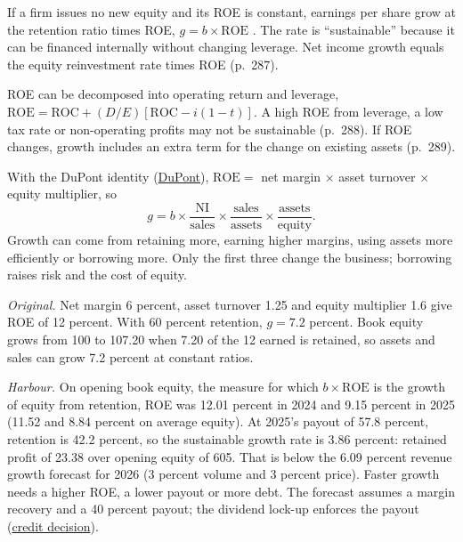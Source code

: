 \begin{qfmethod}\label{meth:sustainable-growth}
 If a firm issues no new equity and its ROE is constant, earnings per share grow at the retention ratio times ROE, $g=b\times\mathrm{ROE}$ \citep[pp.~285--286]{investment-valuation-2012}. The rate is ``sustainable'' because it can be financed internally without changing leverage. Net income growth equals the equity reinvestment rate times ROE (p.~287).

ROE can be decomposed into operating return and leverage, $\mathrm{ROE}=\mathrm{ROC}+(D/E)[\mathrm{ROC}-i(1-t)]$. A high ROE from leverage, a low tax rate or non-operating profits may not be sustainable (p.~288). If ROE changes, growth includes an extra term for the change on existing assets (p.~289).

With the DuPont identity (\hyperref[meth:return-on-equity-decomposition]{DuPont}), $\mathrm{ROE}=$ net margin $\times$ asset turnover $\times$ equity multiplier, so
\[ g=b\times\frac{\mathrm{NI}}{\text{sales}}\times\frac{\text{sales}}{\text{assets}}\times\frac{\text{assets}}{\text{equity}}. \]
Growth can come from retaining more, earning higher margins, using assets more efficiently or borrowing more. Only the first three change the business; borrowing raises risk and the cost of equity.

 \emph{Original.} Net margin 6 percent, asset turnover 1.25 and equity multiplier 1.6 give ROE of 12 percent. With 60 percent retention, $g=7.2$ percent. Book equity grows from 100 to 107.20 when 7.20 of the 12 earned is retained, so assets and sales can grow 7.2 percent at constant ratios.

\emph{Harbour.} On opening book equity, the measure for which $b\times\mathrm{ROE}$ is the growth of equity from retention, ROE was 12.01 percent in 2024 and 9.15 percent in 2025 (11.52 and 8.84 percent on average equity). At 2025's payout of 57.8 percent, retention is 42.2 percent, so the sustainable growth rate is 3.86 percent: retained profit of 23.38 over opening equity of 605. That is below the 6.09 percent revenue growth forecast for 2026 (3 percent volume and 3 percent price). Faster growth needs a higher ROE, a lower payout or more debt. The forecast assumes a margin recovery and a 40 percent payout; the dividend lock-up enforces the payout (\hyperref[ex:integrated-credit-decision]{credit decision}).


\end{qfmethod}
